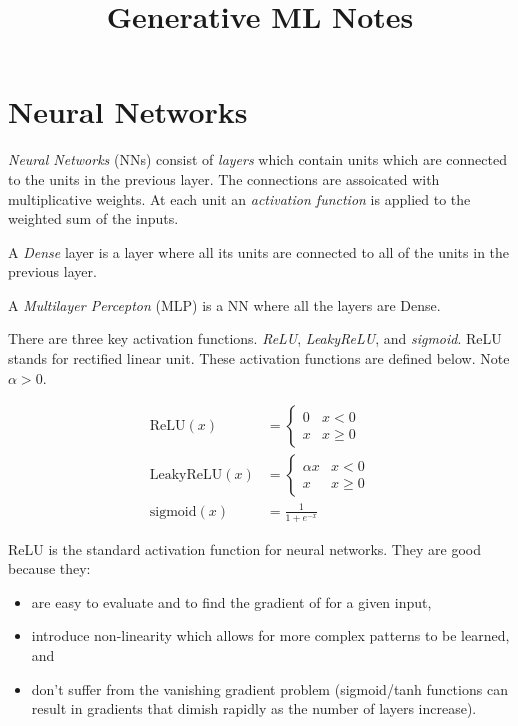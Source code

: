 \documentclass[a4paper,twocolumn]{article}
\title{Generative ML Notes}
\author{}
\date{}
\newcommand{\relu}[1]{\text{ReLU}(#1)}
\newcommand{\lrelu}[1]{\text{LeakyReLU}(#1)}
\newcommand{\sigmoid}[1]{\text{sigmoid}(#1)}
\begin{document}
\maketitle

\section{Neural Networks}

\emph{Neural Networks} (NNs) consist of \emph{layers} which contain units which are connected to the units in the previous layer. The connections are assoicated with multiplicative weights. At each unit an \emph{activation function} is applied to the weighted sum of the inputs.

A \emph{Dense} layer is a layer where all its units are connected to all of the units in the previous layer.

A \emph{Multilayer Percepton} (MLP) is a NN where all the layers are Dense.

There are three key activation functions. \emph{ReLU}, \emph{LeakyReLU}, and \emph{sigmoid}. ReLU stands for rectified linear unit. These activation functions are defined below. Note $\alpha > 0$.

$$
\begin{aligned}
\relu x &= \begin{cases}
0 & x < 0 \\
x & x \geq 0
\end{cases} \\
\lrelu x &= \begin{cases}
\alpha x & x < 0 \\
x & x \geq 0
\end{cases} \\
\sigmoid x &= \frac{1}{1 + e^{-x}}
\end{aligned}
$$

ReLU is the standard activation function for neural networks. They are good because they:

\begin{itemize}
\item are easy to evaluate and to find the gradient of for a given input,
\item introduce non-linearity which allows for more complex patterns to be learned, and
\item don't suffer from the vanishing gradient problem (sigmoid/tanh functions can result in gradients that dimish rapidly as the number of layers increase).
\end{itemize}
\end{document}
